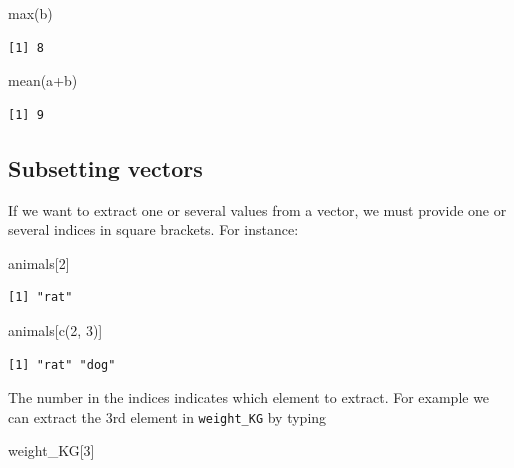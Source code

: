 \documentclass[
  letterpaper,
  DIV=11,
  numbers=noendperiod,
  oneside]{scrreprt}
\newenvironment{Shaded}{\begin{snugshade}}{\end{snugshade}}
\newcommand{\DecValTok}[1]{\textcolor[rgb]{0.68,0.00,0.00}{#1}}
\newcommand{\FunctionTok}[1]{\textcolor[rgb]{0.28,0.35,0.67}{#1}}
\newcommand{\NormalTok}[1]{\textcolor[rgb]{0.00,0.23,0.31}{#1}}
\newcommand{\SpecialCharTok}[1]{\textcolor[rgb]{0.37,0.37,0.37}{#1}}
\begin{document}
\begin{Shaded}
\begin{Highlighting}[]
\FunctionTok{max}\NormalTok{(b)}
\end{Highlighting}
\end{Shaded}

\begin{verbatim}
[1] 8
\end{verbatim}

\begin{Shaded}
\begin{Highlighting}[]
\FunctionTok{mean}\NormalTok{(a}\SpecialCharTok{+}\NormalTok{b)}
\end{Highlighting}
\end{Shaded}

\begin{verbatim}
[1] 9
\end{verbatim}

\subsection{Subsetting vectors}\label{subsetting-vectors}

If we want to extract one or several values from a vector, we must
provide one or several indices in square brackets. For instance:

\begin{Shaded}
\begin{Highlighting}[]
\NormalTok{animals[}\DecValTok{2}\NormalTok{]}
\end{Highlighting}
\end{Shaded}

\begin{verbatim}
[1] "rat"
\end{verbatim}

\begin{Shaded}
\begin{Highlighting}[]
\NormalTok{animals[}\FunctionTok{c}\NormalTok{(}\DecValTok{2}\NormalTok{, }\DecValTok{3}\NormalTok{)]}
\end{Highlighting}
\end{Shaded}

\begin{verbatim}
[1] "rat" "dog"
\end{verbatim}

The number in the indices indicates which element to extract. For
example we can extract the 3rd element in \texttt{weight\_KG} by typing

\begin{Shaded}
\begin{Highlighting}[]
\NormalTok{weight\_KG[}\DecValTok{3}\NormalTok{]}
\end{Highlighting}
\end{Shaded}
\end{document}
